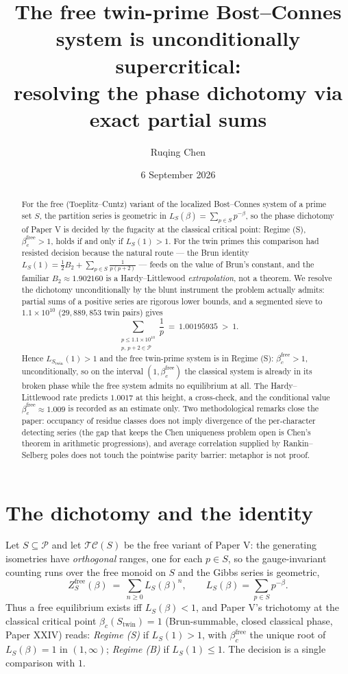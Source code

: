 \documentclass[11pt]{amsart}
\title[The free twin-prime system is supercritical]{The free twin-prime Bost--Connes system is unconditionally supercritical:\\ resolving the phase dichotomy via exact partial sums}
\author{Ruqing Chen}
\date{6 September 2026}
\theoremstyle{remark}
\begin{document}
\begin{abstract}
For the free (Toeplitz--Cuntz) variant of the localized Bost--Connes system of a prime
set $S$, the partition series is geometric in $L_S(\beta)=\sum_{p\in S}p^{-\beta}$, so the
phase dichotomy of Paper V is decided by the fugacity at the classical critical point:
Regime (S), $\beta_c^{\mathrm{free}}>1$, holds if and only if $L_S(1)>1$. For the twin
primes this comparison had resisted decision because the natural route --- the Brun
identity $L_S(1)=\tfrac12B_2+\sum_{p\in S}\tfrac1{p(p+2)}$ --- feeds on the value of
Brun's constant, and the familiar $B_2\approx1.902160$ is a Hardy--Littlewood
\emph{extrapolation}, not a theorem. We resolve the dichotomy unconditionally by the
blunt instrument the problem actually admits: partial sums of a positive series are
rigorous lower bounds, and a segmented sieve to $1.1\times10^{10}$ ($29{,}889{,}853$ twin
pairs) gives
\[
\sum_{\substack{p\le1.1\times10^{10}\\ p,\,p+2\in\mathcal{P}}}\frac1p\ =\ 1.00195935\ >\ 1 .
\]
Hence $L_{S_{\mathrm{twin}}}(1)>1$ and the free twin-prime system is in Regime (S):
$\beta_c^{\mathrm{free}}>1$, unconditionally, so on the interval
$(1,\beta_c^{\mathrm{free}})$ the classical system is already in its broken phase while
the free system admits no equilibrium at all. The Hardy--Littlewood rate predicts
$1.0017$ at this height, a cross-check, and the conditional value
$\beta_c^{\mathrm{free}}\approx1.009$ is recorded as an estimate only. Two methodological
remarks close the paper: occupancy of residue classes does not imply divergence of the
per-character detecting series (the gap that keeps the Chen uniqueness problem open is
Chen's theorem in arithmetic progressions), and average correlation supplied by
Rankin--Selberg poles does not touch the pointwise parity barrier: metaphor is not proof.
\end{abstract}

\maketitle

\section{The dichotomy and the identity}\label{sec:identity}

Let $S\subseteq\mathcal{P}$ and let $\mathcal T\mathcal C(S)$ be the free variant of Paper V: the
generating isometries have \emph{orthogonal} ranges, one for each $p\in S$, so the
gauge-invariant counting runs over the free monoid on $S$ and the Gibbs series is
geometric,
\[
Z^{\mathrm{free}}_S(\beta)\ =\ \sum_{n\ge0}L_S(\beta)^n,\qquad
L_S(\beta)=\sum_{p\in S}p^{-\beta}.
\]
Thus a free equilibrium exists iff $L_S(\beta)<1$, and Paper V's trichotomy at the
classical critical point $\beta_c(S_{\mathrm{twin}})=1$ (Brun-summable, closed classical
phase, Paper XXIV) reads: \emph{Regime (S)} if $L_S(1)>1$, with
$\beta_c^{\mathrm{free}}$ the unique root of $L_S(\beta)=1$ in $(1,\infty)$;
\emph{Regime (B)} if $L_S(1)\le1$. The decision is a single comparison with $1$.
\end{document}
